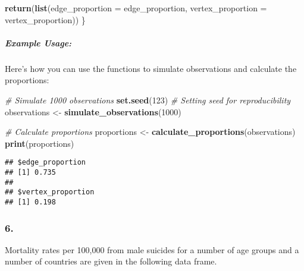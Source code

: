 \documentclass[
]{article}
\newenvironment{Shaded}{\begin{snugshade}}{\end{snugshade}}
\newcommand{\AttributeTok}[1]{\textcolor[rgb]{0.13,0.29,0.53}{#1}}
\newcommand{\CommentTok}[1]{\textcolor[rgb]{0.56,0.35,0.01}{\textit{#1}}}
\newcommand{\DecValTok}[1]{\textcolor[rgb]{0.00,0.00,0.81}{#1}}
\newcommand{\FunctionTok}[1]{\textcolor[rgb]{0.13,0.29,0.53}{\textbf{#1}}}
\newcommand{\NormalTok}[1]{#1}
\newcommand{\OtherTok}[1]{\textcolor[rgb]{0.56,0.35,0.01}{#1}}
\begin{document}
\begin{Shaded}
\begin{Highlighting}[]
  \FunctionTok{return}\NormalTok{(}\FunctionTok{list}\NormalTok{(}\AttributeTok{edge\_proportion =}\NormalTok{ edge\_proportion, }\AttributeTok{vertex\_proportion =}\NormalTok{ vertex\_proportion))}
\NormalTok{\}}
\end{Highlighting}
\end{Shaded}

\subparagraph{Example Usage:}\label{example-usage}

Here's how you can use the functions to simulate observations and
calculate the proportions:

\begin{Shaded}
\begin{Highlighting}[]
\CommentTok{\# Simulate 1000 observations}
\FunctionTok{set.seed}\NormalTok{(}\DecValTok{123}\NormalTok{)  }\CommentTok{\# Setting seed for reproducibility}
\NormalTok{observations }\OtherTok{\textless{}{-}} \FunctionTok{simulate\_observations}\NormalTok{(}\DecValTok{1000}\NormalTok{)}

\CommentTok{\# Calculate proportions}
\NormalTok{proportions }\OtherTok{\textless{}{-}} \FunctionTok{calculate\_proportions}\NormalTok{(observations)}
\FunctionTok{print}\NormalTok{(proportions)}
\end{Highlighting}
\end{Shaded}

\begin{verbatim}
## $edge_proportion
## [1] 0.735
## 
## $vertex_proportion
## [1] 0.198
\end{verbatim}

\subsubsection{6.}\label{section-5}

Mortality rates per 100,000 from male suicides for a number of age
groups and a number of countries are given in the following data frame.
\end{document}
